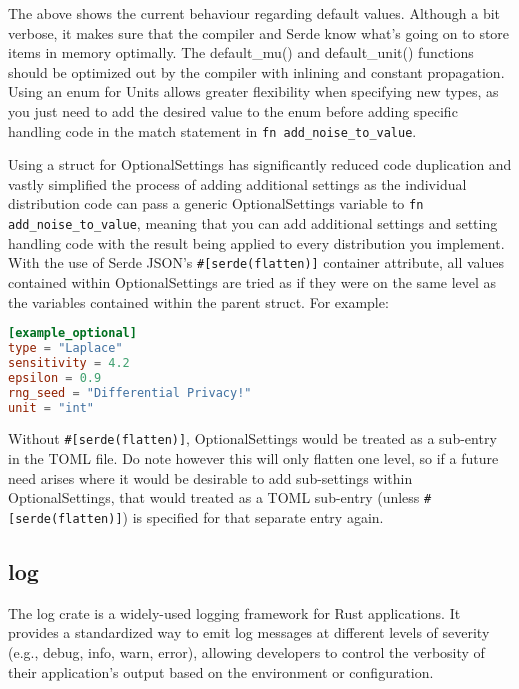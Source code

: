 

The above shows the current behaviour regarding default values. Although a bit verbose, it makes sure that the compiler and Serde know what's going on to store items in memory optimally. The default\_mu() and default\_unit() functions should be optimized out by the compiler with inlining and constant propagation. Using an enum for Units allows greater flexibility when specifying new types, as you just need to add the desired value to the enum before adding specific handling code in the match statement in \texttt{fn add\_noise\_to\_value}.

Using a struct for OptionalSettings has significantly reduced code duplication and vastly simplified the process of adding additional settings as the individual distribution code can pass a generic OptionalSettings variable to \texttt{fn add\_noise\_to\_value}, meaning that you can add additional settings and setting handling code with the result being applied to every distribution you implement. With the use of Serde JSON's \texttt{\#[serde(flatten)]} container attribute, all values contained within OptionalSettings are tried as if they were on the same level as the variables contained within the parent struct. For example:

\begin{lstlisting}[language=TOML, caption={Test}]
[example_optional]
type = "Laplace"
sensitivity = 4.2
epsilon = 0.9
rng_seed = "Differential Privacy!"
unit = "int"
\end{lstlisting}
Without \texttt{\#[serde(flatten)]}, OptionalSettings would be treated as a sub-entry in the TOML file. Do note however this will only flatten one level, so if a future need arises where it would be desirable to add sub-settings within OptionalSettings, that would treated as a TOML sub-entry (unless \texttt{\#[serde(flatten)]}) is specified for that separate entry again.

\subsection{log}
The log crate is a widely-used logging framework for Rust applications. It provides a standardized way to emit log messages at different levels of severity (e.g., debug, info, warn, error), allowing developers to control the verbosity of their application's output based on the environment or configuration.

